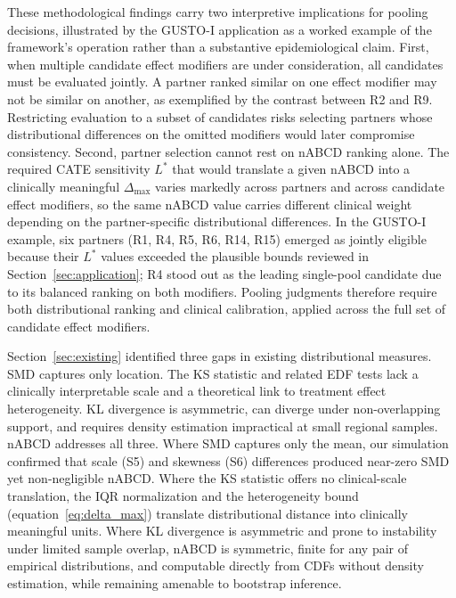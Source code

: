 \documentclass[AMA,Times1COL]{WileyNJDv5}
\begin{document}
These methodological findings carry two interpretive implications for pooling decisions, illustrated by the GUSTO-I application as a worked example of the framework's operation rather than a substantive epidemiological claim. First, when multiple candidate effect modifiers are under consideration, all candidates must be evaluated jointly. A partner ranked similar on one effect modifier may not be similar on another, as exemplified by the contrast between R2 and R9. Restricting evaluation to a subset of candidates risks selecting partners whose distributional differences on the omitted modifiers would later compromise consistency. Second, partner selection cannot rest on nABCD ranking alone. The required CATE sensitivity $L^*$ that would translate a given nABCD into a clinically meaningful $\Delta_{\max}$ varies markedly across partners and across candidate effect modifiers, so the same nABCD value carries different clinical weight depending on the partner-specific distributional differences. In the GUSTO-I example, six partners (R1, R4, R5, R6, R14, R15) emerged as jointly eligible because their $L^*$ values exceeded the plausible bounds reviewed in Section~\ref{sec:application}; R4 stood out as the leading single-pool candidate due to its balanced ranking on both modifiers. Pooling judgments therefore require both distributional ranking and clinical calibration, applied across the full set of candidate effect modifiers.

Section~\ref{sec:existing} identified three gaps in existing distributional measures. SMD captures only location. The KS statistic and related EDF tests lack a clinically interpretable scale and a theoretical link to treatment effect heterogeneity. KL divergence is asymmetric, can diverge under non-overlapping support, and requires density estimation impractical at small regional samples. nABCD addresses all three. Where SMD captures only the mean, our simulation confirmed that scale (S5) and skewness (S6) differences produced near-zero SMD yet non-negligible nABCD. Where the KS statistic offers no clinical-scale translation, the IQR normalization and the heterogeneity bound (equation~\ref{eq:delta_max}) translate distributional distance into clinically meaningful units. Where KL divergence is asymmetric and prone to instability under limited sample overlap, nABCD is symmetric, finite for any pair of empirical distributions, and computable directly from CDFs without density estimation, while remaining amenable to bootstrap inference.
\end{document}
